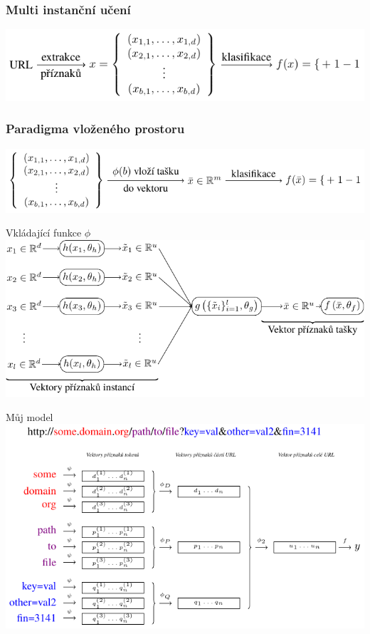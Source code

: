 \documentclass[10pt]{beamer}
\begin{document}
\begin{frame}[c]\frametitle{Multi instanční učení}
	\centering
	\includegraphics{images/multi_instance_learning/multi_instance_learning.pdf}
\end{frame}

\begin{frame}[c]\frametitle{Paradigma vloženého prostoru}
	\centering
	\includegraphics{images/embedded_space_paradigm/embedded_space_paradigm.pdf}
\end{frame}

\begin{frame}{Vkládající funkce \( \phi \)}
	\centering
	\includegraphics[width=0.9\pagewidth]{images/embedding_function/embedding_function.pdf}
\end{frame}

\begin{frame}{Můj model}
	\centering
	\includegraphics{images/model_modified_MIL/model_modified_MIL.pdf}
\end{frame}
\end{document}
